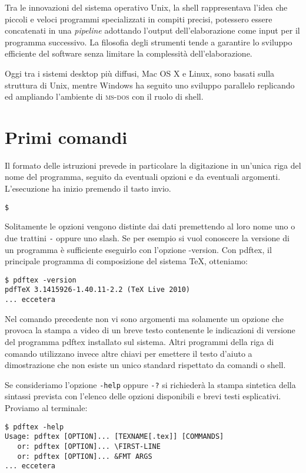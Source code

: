 Tra le innovazioni del sistema operativo Unix, la shell rappresentava l'idea che piccoli e veloci programmi specializzati in compiti precisi, potessero essere concatenati in una \emph{pipeline} adottando l'output dell'elaborazione come input per il programma successivo. La filosofia degli strumenti tende a garantire lo sviluppo efficiente del software senza limitare la complessità dell'elaborazione.

Oggi tra i sistemi desktop più diffusi, Mac OS X e Linux, sono basati sulla struttura di Unix, mentre Windows ha seguito uno sviluppo parallelo replicando ed ampliando l'ambiente di \textsc{ms-dos} con il ruolo di shell.



\section{Primi comandi}

Il formato delle istruzioni prevede in particolare la digitazione in un'unica riga del nome del programma, seguito da eventuali opzioni e da eventuali argomenti. L'esecuzione ha inizio premendo il tasto invio.
\medskip

\texttt{\$   }
\medskip

Solitamente le opzioni vengono distinte dai dati premettendo al loro nome uno o due trattini \texttt{-} oppure uno slash. Se per esempio si vuol conoscere la versione di un programma è sufficiente eseguirlo con l'opzione \textsf{-version}. Con \textsf{pdftex}, il principale programma di composizione del sistema \TeX{}, otteniamo:
\begin{verbatim}
$ pdftex -version
pdfTeX 3.1415926-1.40.11-2.2 (TeX Live 2010)
... eccetera
\end{verbatim}

Nel comando precedente non vi sono argomenti ma solamente un opzione che provoca la stampa a video di un breve testo contenente le indicazioni di versione del programma \textsf{pdftex} installato sul sistema. Altri programmi della riga di comando utilizzano invece altre chiavi per emettere il testo d'aiuto a dimostrazione che non esiste un unico standard rispettato da comandi o shell.

Se consideriamo l'opzione \texttt{-help} oppure \texttt{-?} si richiederà la stampa sintetica della sintassi prevista con l'elenco delle opzioni disponibili e brevi testi esplicativi. Proviamo al terminale:
\begin{verbatim}
$ pdftex -help
Usage: pdftex [OPTION]... [TEXNAME[.tex]] [COMMANDS]
   or: pdftex [OPTION]... \FIRST-LINE
   or: pdftex [OPTION]... &FMT ARGS
... eccetera
\end{verbatim}

